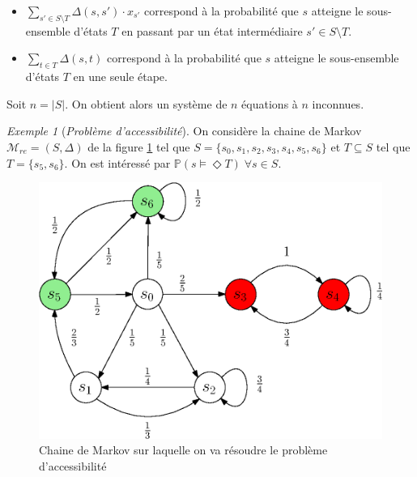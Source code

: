 \documentclass[12pt,a4paper]{report}
\theoremstyle{definition}%
\theoremstyle{remark}
\newtheorem{example}{Exemple}[chapter]
\let\labelitemi\labelitemii
\begin{document}
\begin{itemize}
\renewcommand{\labelitemi}{\tiny$\bullet$}
	\item $ \sum_{s' \in S \setminus T}  \Delta(s, s') \cdot x_{s'} $ correspond à la probabilité que $s$ atteigne le sous-ensemble d'états $T$ en passant par un état intermédiaire $s' \in S \setminus T$.
	\item $\sum_{t \in T} \Delta(s, t)$ correspond à la probabilité que $s$ atteigne le sous-ensemble d'états $T$ en une seule étape.
\end{itemize}
Soit $n = |S|$. On obtient alors un système de $n$ équations à $n$ inconnues.

\begin{example}[\textit{Problème d'accessibilité}]\label{reachex}
	On considère la chaine de Markov $\mathcal{M}_{re} = (S, \Delta)$ de la figure \ref{reachability-example} tel que $S = \{s_0, s_1, s_2, s_3, s_4, s_5, s_6\}$ et $T \subseteq S$ tel que $T = \{ s_5, s_6 \}$. On est intéressé par $\mathbb{P}(s \models \Diamond T) \; \forall s \in S$.
	\begin{figure}[H]
	\centering
	\includegraphics[scale=0.7]{figures/reachability-example.eps}
	\caption{Chaine de Markov sur laquelle on va résoudre le problème d'accessibilité}
	\label{reachability-example}
	\end{figure}


\end{example}
\end{document}
